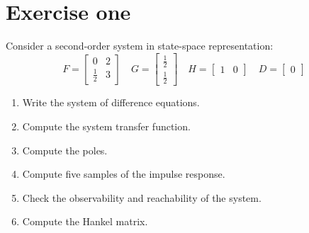 \section{Exercise one}

Consider a second-order system in state-space representation:
\[F=\begin{bmatrix} 0 & 2 \\ \frac{1}{2} & 3 \end{bmatrix}\quad G=\begin{bmatrix} \frac{1}{2} \\ \frac{1}{2} \end{bmatrix}\quad H=\begin{bmatrix} 1 & 0 \end{bmatrix}\quad D=\begin{bmatrix} 0 \end{bmatrix}\]
\begin{enumerate}
    \item Write the system of difference equations.
    \item Compute the system transfer function.
    \item Compute the poles.
    \item Compute five samples of the impulse response. 
    \item Check the observability and reachability of the system. 
    \item Compute the Hankel matrix. 
\end{enumerate}

